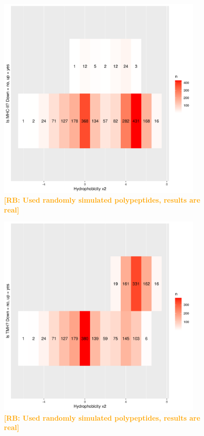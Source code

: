 \documentclass{article}
\newcommand{\richel}[1]{\textcolor{orange}{\textbf{[RB: #1]}}}
\begin{document}
\begin{figure}[!htbp]
  \includegraphics[width=0.9\textwidth]{p_bind_per_hydrophobicity/hydrophobicity_vs_binds_mhc2.png}
  \caption{
    \richel{Used randomly simulated polypeptides, results are real}
  }
  \label{fig:hydrophobicity_vs_binds_mhc2}
\end{figure}

\begin{figure}[!htbp]
  \includegraphics[width=0.9\textwidth]{p_bind_per_hydrophobicity/hydrophobicity_vs_is_tmh.png}
  \caption{
    \richel{Used randomly simulated polypeptides, results are real}
  }
  \label{fig:hydrophobicity_vs_is_tmh}
\end{figure}
\end{document}
